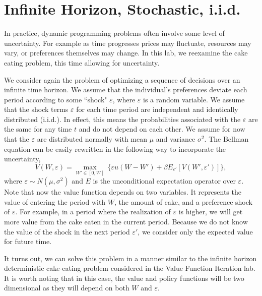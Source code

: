 \newcommand\ve{\varepsilon}


\section*{Infinite Horizon, Stochastic, i.i.d.}\label{SecRecProbInfinHorStochiid}

In practice, dynamic programming problems often involve some level of uncertainty.
For example as time progresses prices may fluctuate, resources may vary, or preferences themselves may change.
 In this lab, we reexamine the cake eating problem, this time allowing for uncertainty.

We consider again the problem of optimizing a sequence of decisions over an infinite time horizon.
We assume that the individual's preferences deviate each period according to some ``shock" $\ve$,
where $\ve$ is a random variable.  We assume that the shock terms $\ve$ for each time period are
independent and identically
distributed (i.i.d.).  In effect, this means the probabilities associated with the $\ve$ are the
same for any time $t$ and do not depend on each other.  We assume for now that the $\ve$ are
distributed normally with mean $\mu$ and variance $\sigma^2$.  The Bellman equation can be easily
rewritten in the following way to incorporate the uncertainty,
\begin{equation}\label{stoch_Bellman}
   V\left(W,\ve\right) = \max_{W'\in[0,W]}\: \{\ve u\left(W - W'\right) +
   \beta E_{\ve'}\left[V\left(W',\ve'\right)\right]\},
\end{equation}
where $\ve \sim N(\mu,\sigma^2)$ and
$E$ is the unconditional expectation operator over $\ve$.  Note that now the value function depends
on two variables.  It represents the value of entering the period with $W$, the amount of cake,
and a preference shock of $\ve$.  For example, in a period where the realization of $\ve$ is higher,
we will get more value from the cake eaten in the current period.  Because we do not know the value of
the shock in the next period $\ve'$, we consider only the expected value for future time.

It turns out, we can solve this problem in a manner similar to the infinite horizon deterministic cake-eating
problem considered in the Value Function Iteration lab.  It is worth noting that in this case,
 the value and policy functions will be two dimensional as they will depend on both $W$ and $\ve$.

